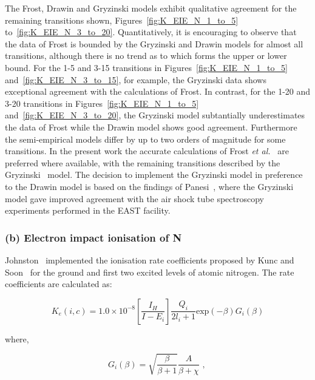 {\par

The Frost, Drawin and Gryzinski models exhibit qualitative agreement for the remaining transitions shown, Figures~\ref{fig:K_EIE_N_1_to_5} to~\ref{fig:K_EIE_N_3_to_20}.
Quantitatively, it is encouraging to observe that the data of Frost is bounded by the Gryzinski and Drawin models for almost all transitions, although there is no trend as to which forms the upper or lower bound.
For the 1-5 and 3-15 transitions in Figures~\ref{fig:K_EIE_N_1_to_5} and~\ref{fig:K_EIE_N_3_to_15}, for example, the Gryzinski data shows exceptional agreement with the calculations of Frost.
In contrast, for the 1-20 and 3-20 transitions in Figures~\ref{fig:K_EIE_N_1_to_5} and~\ref{fig:K_EIE_N_3_to_20}, the Gryzinski model subtantially underestimates the data of Frost while the Drawin model shows good agreement.
Furthermore the semi-empirical models differ by up to two orders of magnitude for some transitions.
In the present work the accurate calculations of Frost \textit{et al.}~\cite{FAS+1998} are preferred where available, with the remaining transitions described by the Gryzinski~\cite{Gryz59} model.
The decision to implement the Gryzinski model in preference to the Drawin model is based on the findings of Panesi~\cite{panesi_2008B,panesi_phd}, where the Gryzinski model gave improved agreement with the air shock tube spectroscopy experiments performed in the EAST facility.

\subsubsection{(b) Electron impact ionisation of N}

Johnston~\cite{JohnPhd} implemented the ionisation rate coefficients proposed by Kunc and Soon~\cite{KS1989} for the ground and first two excited levels of atomic nitrogen.
The rate coefficients are calculated as:

\begin{equation}
 K_e(i,c) = 1.0 \times 10^{-8} \left [ \frac{I_H}{I - E_i} \right ] \frac{Q_i}{2 l_i + 1} \text{exp} \left ( - \beta \right ) G_i \left ( \beta \right ) \label{eq:K_EII_Soon_Kunc_a}
\end{equation}

\noindent where,

\begin{equation}
 G_i ( \beta ) = \sqrt{\frac{\beta}{\beta+1}} \frac{A}{\beta + \chi} \text{ , }
\end{equation}

}
